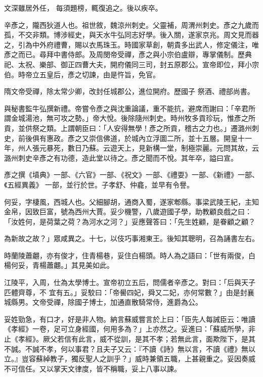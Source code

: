\begin{pinyinscope}
 文深雖居外任，
 每須題榜，輒復追之。後以疾卒。



 辛彥之，隴西狄道人也。祖世敘，魏涼州刺史。父靈補，周渭州刺史。彥之九歲而孤，不交非類。博涉經史，與天水牛弘同志好學。後入關，遂家京兆。周文見而器之，引為中外府禮曹，賜以衣馬珠玉。時國家草創，朝貴多出武人，修定儀注，唯彥之而已。尋拜中書侍郎。及周閔帝受禪，彥之與小宗伯盧辯，專掌儀制。歷典祀、太祝、樂部、御正四曹大夫，開府儀同三司，封五原郡公。宣帝即位，拜小宗伯。時帝立五皇后，彥之切諫，由是忤旨，免官。



 隋文帝受禪，除太常少卿，改封任城郡公，進位開府。歷國子
 祭酒、禮部尚書。



 與秘書監牛弘撰新禮。帝嘗令彥之與沈重論議，重不能抗，避席而謝曰：「辛君所謂金城湯池，無可攻之勢。」帝大悅。後除隨州刺史。時州牧多貢珍玩，惟彥之所貢，並供祭之類。上謂朝臣曰：「人安得無學！彥之所貢，稽古之力也。」遷潞州刺史，前後俱有惠政。彥之又崇信佛道，於城內立浮圖二所，並十五層。開皇十一年，州人張元暴死，數日乃蘇。云遊天上，見新構一堂，制極崇麗。元問其故，云潞州刺史辛彥之有功德，造此堂以待之。彥之聞而不悅。其年卒，謚曰宣。



 彥之撰《墳典》一部、《六官》一部、《祝文》一部、《禮耍》一部、《新禮》一部、《五經異義》
 一部，並行於世。子孝舒、仲龕，並早有令譽。



 何妥，字棲風，西城人也。父細腳胡，通商入蜀，遂家郫縣。事梁武陵王紀，主知金帛，因致巨富，號為西州大賈。妥少機警，八歲遊國子學，助教顧良戲之曰：「汝姓何，是荷葉之荷？為河水之河？」妥應聲答曰：「先生姓顧，是眷顧之顧？



 為新故之故？」眾咸異之。十七，以伎巧事湘東王。後知其聰明，召為誦書左右。



 時蘭陵蕭翽，亦有俊才，住青楊巷，妥住白楊頭。時人為之語曰：「世有兩俊，白楊何妥，青楊蕭翽。」其見美如此。



 江陵平，入周，仕為太學博士。宣帝初立五后，問儒者辛彥之。對曰：「后與天子匹體齊尊，不
 宜有五。」妥駮曰：「帝嚳四妃，舜又二妃，亦何常數？」由是封襄城縣男。文帝受禪，除國子博士，加通直散騎常侍，進爵為公。



 妥姓勁急，有口才，好是非人物。納言蘇威嘗言於上曰：「臣先人每誡臣云：唯讀《孝經》一卷，足可立身經國，何用多為？」上亦然之。妥進曰：「蘇威所學，非止《孝經》。厥父若信有此言，威不從訓，是其不孝；若無此言，面欺陛下，是其不誠。不誠不孝，何以事君？且夫子又云：『不讀《詩》無以言，不讀《禮》無以立。』豈容蘇綽教子，獨反聖人之訓乎？」威時兼領五職，上甚親重之。妥因奏威不可信任。又以掌天文律度，皆不稱職，妥上八事以諫。




\end{pinyinscope}
